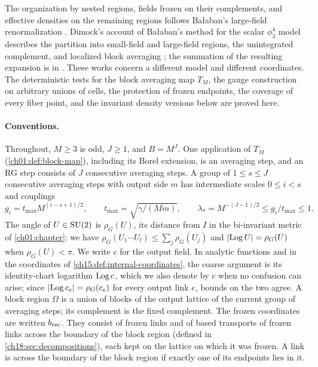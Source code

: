The organization by nested regions, fields frozen on their complements, and effective densities on the remaining regions follows Bałaban's large-field renormalization \cite{Balaban1988Convergent,Balaban1989LargeI,Balaban1989LargeII}. Dimock's account of Bałaban's method for the scalar $\phi^4_3$ model describes the partition into small-field and large-field regions, the unintegrated complement, and localized block averaging \cite[\S\S1--2]{Dimock2013Large}; the summation of the resulting expansion is in \cite{Dimock2014Convergence}. These works concern a different model and different coordinates. The deterministic tests for the block averaging map $T_M$, the gauge construction on arbitrary unions of cells, the protection of frozen endpoints, the coverage of every fiber point, and the invariant density versions below are proved here.

\paragraph{Conventions.}
Throughout, $M\ge3$ is odd, $J\ge1$, and $B=M^J$. One application of $T_M$ (\cref{ch01:def:block-map}), including its Borel extension, is an averaging step, and an RG step consists of $J$ consecutive averaging steps. A group of $1\le s\le J$ consecutive averaging steps with output side $m$ has intermediate scales $0\le i<s$ and couplings
\[
 g_i=t_{\max}M^{(i-s+1)/2},\qquad t_{\max}=\sqrt{\gamma/(Mm)},\qquad \lambda_*=M^{-(J-1)/2}\le g_i/t_{\max}\le1.
\]
The angle of $U\in\mathrm{SU}(2)$ is $\rho_G(U)$, its distance from $I$ in the bi-invariant metric of \cref{ch01:chapter}; we have $\rho_G(U_1\cdots U_l)\le\sum_j\rho_G(U_j)$ and $\lvert \operatorname{Log} U\rvert=\rho_G(U)$ when $\rho_G(U)<\pi$. We write $c$ for the output field. In analytic functions and in the coordinates of \cref{ch15:def:internal-coordinates}, the coarse argument is its identity-chart logarithm $\operatorname{Log} c$, which we also denote by $c$ when no confusion can arise; since $\lvert \operatorname{Log} c_e\rvert=\rho_G(c_e)$ for every output link $e$, bounds on the two agree. A block region $\Omega$ is a union of blocks of the output lattice of the current group of averaging steps; its complement is the fixed complement. The frozen coordinates are written $b_{\mathrm{rec}}$. They consist of frozen links and of based transports of frozen links across the boundary of the block region (defined in \cref{ch18:sec:decompositions}), each kept on the lattice on which it was frozen. A link is across the boundary of the block region if exactly one of its endpoints lies in it.

